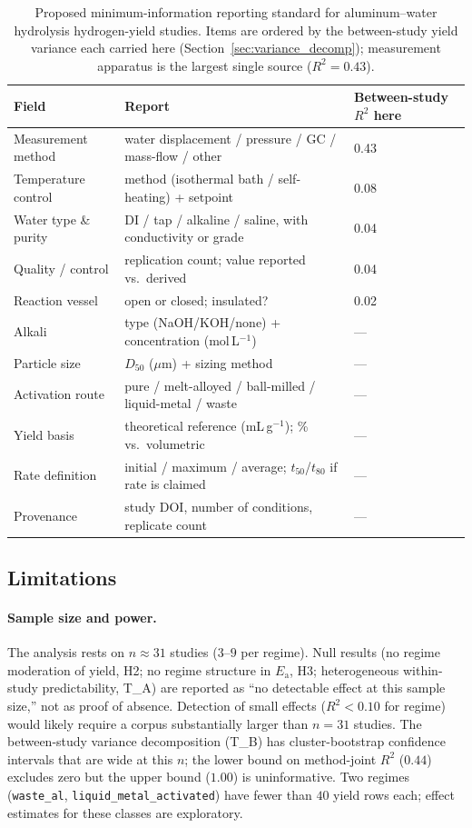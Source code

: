 \begin{table}[t]\centering\small
\caption{Proposed minimum-information reporting standard for aluminum--water hydrolysis
hydrogen-yield studies. Items are ordered by the between-study yield variance each
carried here (Section~\ref{sec:variance_decomp}); measurement apparatus is the largest
single source ($R^2\!=\!0.43$).}
\label{tab:mireport}
\begin{tabular}{lll}
\toprule
Field & Report & Between-study $R^2$ here \\
\midrule
Measurement method   & water displacement / pressure / GC / mass-flow / other & 0.43 \\
Temperature control  & method (isothermal bath / self-heating) + setpoint & 0.08 \\
Water type \& purity & DI / tap / alkaline / saline, with conductivity or grade & 0.04 \\
Quality / control    & replication count; value reported vs.\ derived & 0.04 \\
Reaction vessel      & open or closed; insulated? & 0.02 \\
Alkali               & type (NaOH/KOH/none) + concentration (mol\,L$^{-1}$) & --- \\
Particle size        & $D_{50}$ ($\mu$m) + sizing method & --- \\
Activation route     & pure / melt-alloyed / ball-milled / liquid-metal / waste & --- \\
Yield basis          & theoretical reference (mL\,g$^{-1}$); \% vs.\ volumetric & --- \\
Rate definition      & initial / maximum / average; $t_{50}$/$t_{80}$ if rate is claimed & --- \\
Provenance           & study DOI, number of conditions, replicate count & --- \\
\bottomrule
\end{tabular}
\end{table}

\subsection{Limitations}
\label{sec:limitations}

\paragraph{Sample size and power.}
The analysis rests on $n\!\approx\!31$ studies ($3$--$9$ per regime). Null results
(no regime moderation of yield, H2; no regime structure in $E_\mathrm{a}$, H3;
heterogeneous within-study predictability, T\_A) are reported as ``no detectable effect
at this sample size,'' not as proof of absence. Detection of small effects ($R^2\!<\!0.10$ for regime) would
likely require a corpus substantially larger than $n\!=\!31$ studies.
The between-study variance decomposition
(T\_B) has cluster-bootstrap confidence intervals that are wide at this $n$; the lower
bound on method-joint $R^2$ ($0.44$) excludes zero but the upper bound ($1.00$) is
uninformative. Two regimes (\texttt{waste\_al}, \texttt{liquid\_metal\_activated}) have
fewer than $40$ yield rows each; effect estimates for these classes are exploratory.

